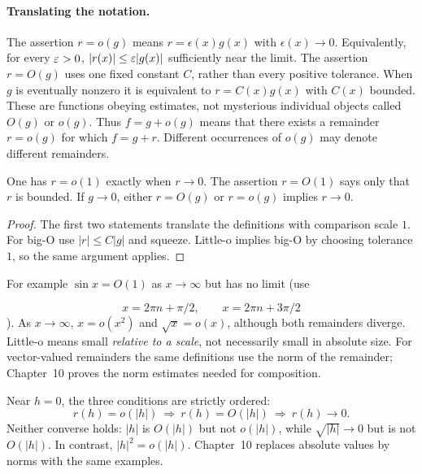 \paragraph{Translating the notation.}
The assertion $r=o(g)$ means $r=\epsilon(x)g(x)$ with
$\epsilon(x)\to0$. Equivalently, for every $\varepsilon>0$,
$|r(x)|\leq\varepsilon|g(x)|$ sufficiently near the limit. The assertion
$r=O(g)$ uses one fixed constant $C$, rather than every positive tolerance.
When $g$ is eventually nonzero it is equivalent to $r=C(x)g(x)$ with
$C(x)$ bounded. These are functions obeying estimates, not mysterious
individual objects called $O(g)$ or $o(g)$. Thus $f=g+o(g)$ means that
there exists a remainder $r=o(g)$ for which $f=g+r$. Different occurrences
of $o(g)$ may denote different remainders.

\begin{proposition}
\label{prop:asymptotic-vanishing}
One has $r=o(1)$ exactly when $r\to0$. The assertion $r=O(1)$ says
only that $r$ is bounded. If $g\to0$, either $r=O(g)$ or $r=o(g)$
implies $r\to0$.
\end{proposition}
\begin{proof}
The first two statements translate the definitions with comparison scale
$1$. For big-O use $|r|\leq C|g|$ and squeeze. Little-o implies big-O
by choosing tolerance $1$, so the same argument applies.
\end{proof}
For example $\sin x=O(1)$ as $x\to\infty$ but has no limit (use

\[
x=2\pi n+\pi/2,\qquad x=2\pi n+3\pi/2
\]
). As $x\to\infty$,
$x=o(x^2)$ and $\sqrt{x}=o(x)$, although both remainders diverge.
Little-o means small \emph{relative to a scale}, not necessarily small
in absolute size.
For vector-valued remainders the same definitions use the norm of the
remainder; Chapter~10 proves the norm estimates needed for composition.

Near $h=0$, the three conditions are strictly ordered:
\[
r(h)=o(|h|)\ \Longrightarrow\ r(h)=O(|h|)\ \Longrightarrow\ r(h)\to0.
\]
Neither converse holds: $|h|$ is $O(|h|)$ but not $o(|h|)$, while
$\sqrt{|h|}\to0$ but is not $O(|h|)$. In contrast, $|h|^2=o(|h|)$.
Chapter~10 replaces absolute values by norms with the same examples.

